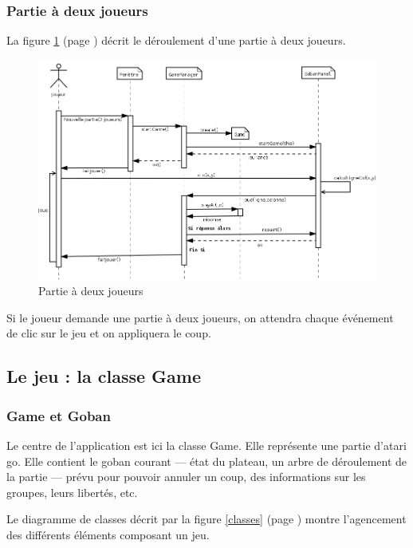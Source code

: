 \documentclass[11pt,a4paper,titlepage,french]{article}
\begin{document}
			\subsubsection{Partie à deux joueurs}

				La figure \ref{twoplayers} (page \pageref{twoplayers}) décrit le déroulement d'une partie à deux joueurs.

				\begin{figure}[ohbt]
					\begin{center}
						\includegraphics[width=1.1\textwidth]{./IA_2J.png}
					\end{center}
					\caption{Partie à deux joueurs}
					\label{twoplayers}
				\end{figure}

				Si le joueur demande une partie à deux joueurs, on attendra chaque événement de clic sur le jeu et on appliquera le coup.

		\subsection{Le jeu : la classe Game}\label{howgame}


			\subsubsection{Game et Goban}

			Le centre de l'application est ici la classe Game. Elle représente une partie d'atari go. Elle contient le goban courant --- état du plateau, un arbre de déroulement de la partie --- prévu pour pouvoir annuler un coup, des informations sur les groupes, leurs libertés, etc.

			Le diagramme de classes décrit par la figure \ref{classes} (page \pageref{classes}) montre l'agencement des différents éléments composant un jeu.
\end{document}
